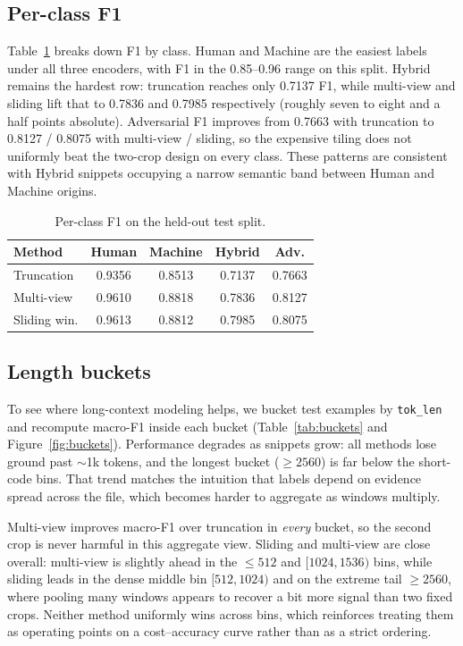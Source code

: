 \documentclass[10pt]{article}
\begin{document}
\subsection{Per-class F1}
Table~\ref{tab:perclass} breaks down F1 by class. Human and Machine are the easiest labels under all three encoders, with F1 in the 0.85--0.96 range on this split. Hybrid remains the hardest row: truncation reaches only 0.7137 F1, while multi-view and sliding lift that to 0.7836 and 0.7985 respectively (roughly seven to eight and a half points absolute). Adversarial F1 improves from 0.7663 with truncation to 0.8127 / 0.8075 with multi-view / sliding, so the expensive tiling does not uniformly beat the two-crop design on every class. These patterns are consistent with Hybrid snippets occupying a narrow semantic band between Human and Machine origins.

\begin{table}[htbp]
  \centering
  \caption{Per-class F1 on the held-out test split.}
  \label{tab:perclass}
  \begin{tabular}{@{}lcccc@{}}
    \toprule
    Method & Human & Machine & Hybrid & Adv. \\
    \midrule
    Truncation   & 0.9356 & 0.8513 & 0.7137 & 0.7663 \\
    Multi-view   & 0.9610 & 0.8818 & 0.7836 & 0.8127 \\
    Sliding win. & 0.9613 & 0.8812 & 0.7985 & 0.8075 \\
    \bottomrule
  \end{tabular}
\end{table}

\subsection{Length buckets}
\label{sec:len_buckets}
To see where long-context modeling helps, we bucket test examples by \texttt{tok\_len} and recompute macro-F1 inside each bucket (Table~\ref{tab:buckets} and Figure~\ref{fig:buckets}). Performance degrades as snippets grow: all methods lose ground past $\sim$1k tokens, and the longest bucket ($\geq 2560$) is far below the short-code bins. That trend matches the intuition that labels depend on evidence spread across the file, which becomes harder to aggregate as windows multiply.

Multi-view improves macro-F1 over truncation in \emph{every} bucket, so the second crop is never harmful in this aggregate view. Sliding and multi-view are close overall: multi-view is slightly ahead in the $\leq 512$ and $[1024,1536)$ bins, while sliding leads in the dense middle bin $[512,1024)$ and on the extreme tail $\geq 2560$, where pooling many windows appears to recover a bit more signal than two fixed crops. Neither method uniformly wins across bins, which reinforces treating them as operating points on a cost--accuracy curve rather than as a strict ordering.
\end{document}
